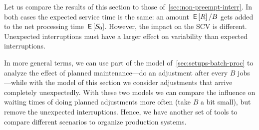 \begin{remark}
  Let us compare the results of this section to those of~\cref{sec:non-preempt-interr}.
  In both cases the expected service time is the same: an amount $\,\mathsf{E}\left[R\right]/ B$ gets added to the net processing time $\,\mathsf{E}\left[S_0\right]$.
  However, the impact on the SCV is different.
  Unexpected interruptions must have a larger effect on variability than expected interruptions.

  In more general terms, we can use part of the model of~\cref{sec:setups-batch-proc} to analyze the effect of planned maintenance---do an adjustment after every $B$ jobs---while with the model of this section we consider adjustments that arrive completely unexpectedly.
  With these two models we can compare the influence on waiting times of doing planned adjustments more often (take $B$ a bit small), but remove the unexpected interruptions.
  Hence, we have another set of tools to compare different scenarios to organize production systems.
\end{remark}



